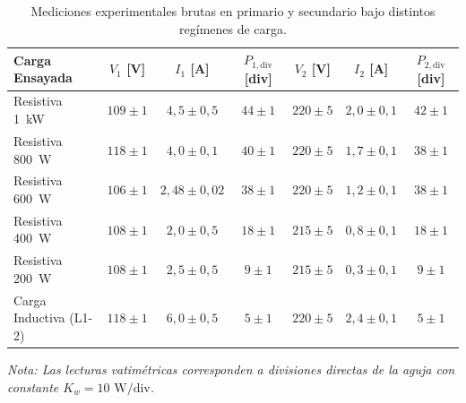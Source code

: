 \begin{table}[htbp]
    \centering
    \caption{Mediciones experimentales brutas en primario y secundario bajo distintos regímenes de carga.}
    \label{tab:mediciones_carga}
    \begin{tabular}{l c c c c c c}
        \toprule
        \textbf{Carga Ensayada} & \textbf{$V_1$ [V]} & \textbf{$I_1$ [A]} & \textbf{$P_{1,\text{div}}$ [div]} & \textbf{$V_2$ [V]} & \textbf{$I_2$ [A]} & \textbf{$P_{2,\text{div}}$ [div]} \\
        \midrule
        Resistiva 1~kW & $109 \pm 1$ & $4{,}5 \pm 0{,}5$ & $44 \pm 1$ & $220 \pm 5$ & $2{,}0 \pm 0{,}1$ & $42 \pm 1$ \\
        Resistiva 800~W & $118 \pm 1$ & $4{,}0 \pm 0{,}1$ & $40 \pm 1$ & $220 \pm 5$ & $1{,}7 \pm 0{,}1$ & $38 \pm 1$ \\
        Resistiva 600~W & $106 \pm 1$ & $2{,}48 \pm 0{,}02$ & $38 \pm 1$ & $220 \pm 5$ & $1{,}2 \pm 0{,}1$ & $38 \pm 1$ \\
        Resistiva 400~W & $108 \pm 1$ & $2{,}0 \pm 0{,}5$ & $18 \pm 1$ & $215 \pm 5$ & $0{,}8 \pm 0{,}1$ & $18 \pm 1$ \\
        Resistiva 200~W & $108 \pm 1$ & $2{,}5 \pm 0{,}5$ & $9 \pm 1$ & $215 \pm 5$ & $0{,}3 \pm 0{,}1$ & $9 \pm 1$ \\
        \midrule
        Carga Inductiva (L1-2) & $118 \pm 1$ & $6{,}0 \pm 0{,}5$ & $5 \pm 1$ & $220 \pm 5$ & $2{,}4 \pm 0{,}1$ & $5 \pm 1$ \\
        \bottomrule
    \end{tabular}
    \par\smallskip
    \footnotesize\textit{Nota: Las lecturas vatimétricas corresponden a divisiones directas de la aguja con constante $K_w = 10\text{ W/div}$.}
\end{table}

